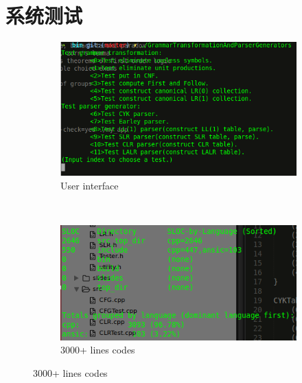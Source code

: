 \documentclass{beamer}
\begin{document}
\section{系统测试}
 \begin{frame}
\begin{figure}
    \centering
    \begin{subfigure}[b]{0.5\textwidth}
        \includegraphics[width=\textwidth]{ui.png}
        \caption{User interface}
        \label{fig:ui}
    \end{subfigure}
    ~ %
    \begin{subfigure}[b]{0.5\textwidth}
        \includegraphics[width=\textwidth]{codes.png}
        \caption{3000+ lines codes}
        \label{fig:codes}
    \end{subfigure}
\end{figure}
 \end{frame}
\end{document}
